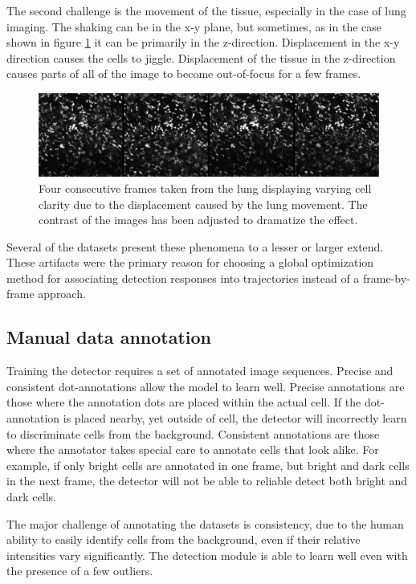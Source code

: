 	The second challenge is the movement of the tissue, especially in the case of lung imaging. The shaking can be in the x-y plane, but sometimes, as in the case shown in figure \cref{fig:data_challenges_movement} it can be primarily in the z-direction. Displacement in the x-y direction causes the cells to jiggle. Displacement of the tissue in the z-direction causes parts of all of the image to become out-of-focus for a few frames.
	
	\begin{figure}[h]
		\includegraphics[width=\textwidth]{images/data_challenge_movement}

		\caption{Four consecutive frames taken from the lung displaying varying cell clarity due to the displacement caused by the lung movement. The contrast of the images has been adjusted to dramatize the effect.}
		\label{fig:data_challenges_movement}
	\end{figure}
	
	Several of the datasets present these phenomena to a lesser or larger extend. These artifacts were the primary reason for choosing a global optimization method for associating detection responses into trajectories instead of a frame-by-frame approach.
	
	\subsection{Manual data annotation}
	\label{sec:data_manual_annotation}
	Training the detector requires a set of annotated image sequences. Precise and consistent dot-annotations allow the model to learn well. Precise annotations are those where the annotation dots are placed within the actual cell. If the dot-annotation is placed nearby, yet outside of cell, the detector will incorrectly learn to discriminate cells from the background. Consistent annotations are those where the annotator takes special care to annotate cells that look alike. For example, if only bright cells are annotated in one frame, but bright and dark cells in the next frame, the detector will not be able to reliable detect both bright and dark cells.
	
	The major challenge of annotating the datasets is consistency, due to the human ability to easily identify cells from the background, even if their relative intensities vary significantly. The detection module is able to learn well even with the presence of a few outliers.
	
